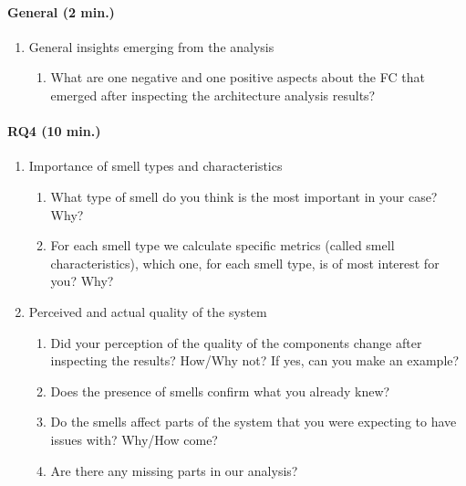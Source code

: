 \paragraph{General (2 min.)}
\begin{enumerate}[resume]
    \item General insights emerging from the analysis
    \begin{enumerate}
        \item What are one negative and one positive aspects about the FC that emerged after inspecting the architecture analysis results?
    \end{enumerate}
\end{enumerate}

\paragraph{RQ4 (10 min.)}
\begin{enumerate}[resume]
    \item Importance of smell types and characteristics
    \begin{enumerate}
        \item What type of smell do you think is the most important in your case? Why?
        \item For each smell type we calculate specific metrics (called smell characteristics),
        which one, for each smell type, is of most interest for you? Why?
    \end{enumerate}
    \item Perceived and actual quality of the system
    \begin{enumerate}
        \item Did your perception of the quality of the components change after inspecting the results? How/Why not? If yes, can you make an example?
        \item Does the presence of smells confirm what you already knew?
        \item Do the smells affect parts of the system that you were expecting to have issues with? Why/How come?
        \item Are there any missing parts in our analysis?
    \end{enumerate}
\end{enumerate}

